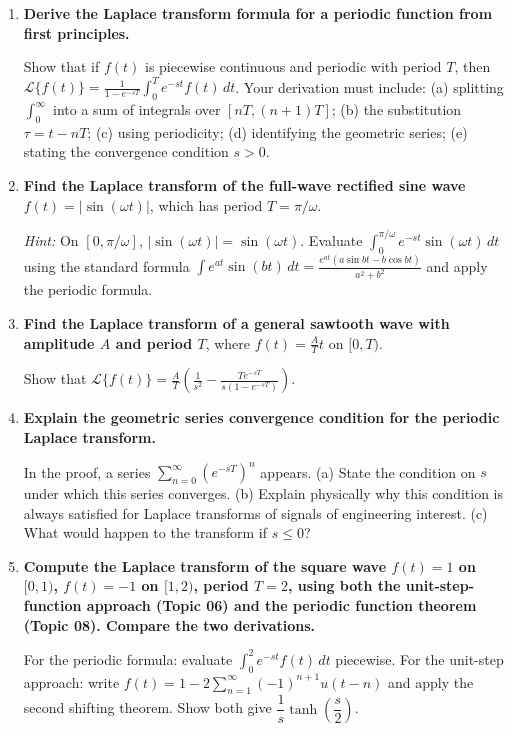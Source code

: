 \documentclass[12pt,a4paper]{article}
\begin{document}
\begin{enumerate}[label=\textbf{\arabic*.}, leftmargin=*]

\item \textbf{Derive the Laplace transform formula for a periodic function
from first principles.}

Show that if $f(t)$ is piecewise continuous and periodic with period $T$,
then $\mathcal{L}\{f(t)\} = \frac{1}{1-e^{-sT}}\int_0^T e^{-st}f(t)\,dt$.
Your derivation must include: (a) splitting $\int_0^\infty$ into a sum of
integrals over $[nT,(n+1)T]$; (b) the substitution $\tau = t-nT$; (c) using
periodicity; (d) identifying the geometric series; (e) stating the convergence
condition $s>0$.

\item \textbf{Find the Laplace transform of the full-wave rectified sine wave}
$f(t) = |\sin(\omega t)|$, which has period $T = \pi/\omega$.

\textit{Hint:} On $[0, \pi/\omega]$, $|\sin(\omega t)| = \sin(\omega t)$.
Evaluate $\int_0^{\pi/\omega} e^{-st}\sin(\omega t)\,dt$ using the standard
formula $\int e^{at}\sin(bt)\,dt = \frac{e^{at}(a\sin bt - b\cos bt)}{a^2+b^2}$
and apply the periodic formula.

\item \textbf{Find the Laplace transform of a general sawtooth wave with
amplitude $A$ and period $T$}, where $f(t) = \frac{A}{T}t$ on $[0,T)$.

Show that $\mathcal{L}\{f(t)\} = \frac{A}{T}\left(\frac{1}{s^2}
- \frac{Te^{-sT}}{s(1-e^{-sT})}\right)$.

\item \textbf{Explain the geometric series convergence condition for the
periodic Laplace transform.}

In the proof, a series $\sum_{n=0}^{\infty}(e^{-sT})^n$ appears.
(a) State the condition on $s$ under which this series converges.
(b) Explain physically why this condition is always satisfied for Laplace
transforms of signals of engineering interest.
(c) What would happen to the transform if $s \le 0$?

\item \textbf{Compute the Laplace transform of the square wave
$f(t) = 1$ on $[0,1)$, $f(t) = -1$ on $[1,2)$, period $T=2$, using
both the unit-step-function approach (Topic 06) and the periodic function
theorem (Topic 08). Compare the two derivations.}

For the periodic formula: evaluate $\int_0^2 e^{-st}f(t)\,dt$ piecewise.
For the unit-step approach: write $f(t) = 1 - 2\sum_{n=1}^{\infty}(-1)^{n+1}
u(t-n)$ and apply the second shifting theorem.
Show both give $\dfrac{1}{s}\tanh\!\left(\dfrac{s}{2}\right)$.

\end{enumerate}
\end{document}
